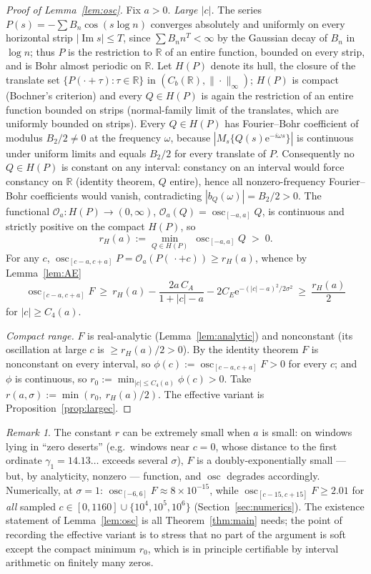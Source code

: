 \documentclass[11pt]{amsart}
\theoremstyle{definition}
\theoremstyle{remark}
\newtheorem{remark}[theorem]{Remark}
\newcommand{\RR}{\mathbb{R}}
\newcommand{\eE}{\mathrm{e}}
\DeclareMathOperator{\Iim}{Im}
\DeclareMathOperator{\osc}{osc}
\begin{document}
\begin{proof}[Proof of Lemma~\ref{lem:osc}]
Fix $a>0$. \emph{Large $|c|$.} The series $P(s)=-\sum B_n\cos(s\log n)$ converges absolutely and uniformly on every horizontal strip $|\Iim s|\le T$, since $\sum B_n n^{T}<\infty$ by the Gaussian decay of $B_n$ in $\log n$; thus $P$ is the restriction to $\RR$ of an entire function, bounded on every strip, and is Bohr almost periodic on $\RR$. Let $H(P)$ denote its hull, the closure of the translate set $\{P(\cdot+\tau):\tau\in\RR\}$ in $(C_b(\RR),\|\cdot\|_\infty)$; $H(P)$ is compact (Bochner's criterion) and every $Q\in H(P)$ is again the restriction of an entire function bounded on strips (normal-family limit of the translates, which are uniformly bounded on strips). Every $Q\in H(P)$ has Fourier--Bohr coefficient of modulus $B_2/2\neq0$ at the frequency $\omega$, because $|M_s\{Q(s)\eE^{-i\omega s}\}|$ is continuous under uniform limits and equals $B_2/2$ for every translate of $P$. Consequently no $Q\in H(P)$ is constant on any interval: constancy on an interval would force constancy on $\RR$ (identity theorem, $Q$ entire), hence all nonzero-frequency Fourier--Bohr coefficients would vanish, contradicting $|b_Q(\omega)|=B_2/2>0$. The functional $\mathcal O_a:H(P)\to(0,\infty)$, $\mathcal O_a(Q)=\osc_{[-a,a]}Q$, is continuous and strictly positive on the compact $H(P)$, so
\[
r_H(a):=\min_{Q\in H(P)}\ \osc_{[-a,a]}Q\;>\;0 .
\]
For any $c$, $\osc_{[c-a,c+a]}P=\mathcal O_a(P(\,\cdot+c))\ge r_H(a)$, whence by Lemma~\ref{lem:AE}
\[
\osc_{[c-a,c+a]}F\ \ge\ r_H(a)-\frac{2a\,C_A}{1+|c|-a}-2C_E\eE^{-(|c|-a)^2/2\sigma^2}\ \ge\ \frac{r_H(a)}2
\]
for $|c|\ge C_4(a)$.

\emph{Compact range.} $F$ is real-analytic (Lemma~\ref{lem:analytic}) and nonconstant (its oscillation at large $c$ is $\ge r_H(a)/2>0$). By the identity theorem $F$ is nonconstant on every interval, so $\phi(c):=\osc_{[c-a,c+a]}F>0$ for every $c$; and $\phi$ is continuous, so $r_0:=\min_{|c|\le C_4(a)}\phi(c)>0$. Take $r(a,\sigma):=\min(r_0,\ r_H(a)/2)$. The effective variant is Proposition~\ref{prop:largec}.
\end{proof}

\begin{remark}\label{rem:deserts}
The constant $r$ can be extremely small when $a$ is small: on windows lying in ``zero deserts'' (e.g.\ windows near $c=0$, whose distance to the first ordinate $\gamma_1=14.13\dots$ exceeds several $\sigma$), $F$ is a doubly-exponentially small --- but, by analyticity, nonzero --- function, and $\osc$ degrades accordingly. Numerically, at $\sigma=1$: $\osc_{[-6,6]}F\approx8\times10^{-15}$, while $\osc_{[c-15,c+15]}F\ge2.01$ for \emph{all} sampled $c\in[0,1160]\cup\{10^4,10^5,10^6\}$ (Section~\ref{sec:numerics}). The existence statement of Lemma~\ref{lem:osc} is all Theorem~\ref{thm:main} needs; the point of recording the effective variant is to stress that no part of the argument is soft except the compact minimum $r_0$, which is in principle certifiable by interval arithmetic on finitely many zeros.
\end{remark}
\end{document}
